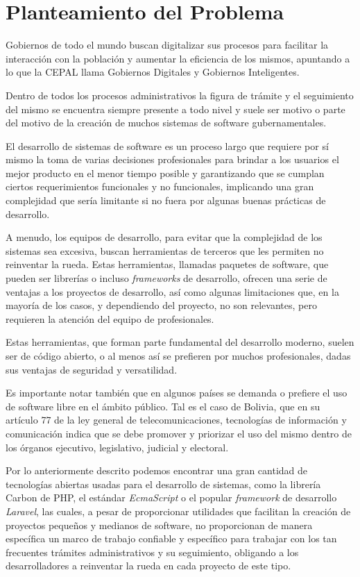 \section{Planteamiento del Problema} \label{problem_statement}

Gobiernos de todo el mundo buscan digitalizar sus
procesos para facilitar la interacción con la población y aumentar la eficiencia
de los mismos, apuntando a lo que la CEPAL llama Gobiernos Digitales y Gobiernos
Inteligentes.

Dentro de todos los procesos administrativos la figura de trámite y el
seguimiento del mismo se encuentra siempre presente a todo nivel y suele ser
motivo o parte del motivo de la creación de muchos sistemas de software
gubernamentales.

El desarrollo de sistemas de software es un proceso largo que requiere por sí
mismo la toma de varias decisiones profesionales para brindar a los usuarios el
mejor producto en el menor tiempo posible y garantizando que se cumplan ciertos
requerimientos funcionales y no funcionales, implicando una gran complejidad que
sería limitante si no fuera por algunas buenas prácticas de desarrollo.

A menudo, los equipos de desarrollo, para evitar que la complejidad de los
sistemas sea excesiva, buscan herramientas de terceros que les permiten no
reinventar la rueda. Estas herramientas, llamadas paquetes de software, que
pueden ser librerías o incluso \textit{frameworks} de desarrollo, ofrecen una serie de
ventajas a los proyectos de desarrollo, así como algunas limitaciones que, en la
mayoría de los casos, y dependiendo del proyecto, no son relevantes, pero
requieren la atención del equipo de profesionales.

Estas herramientas, que forman parte fundamental del desarrollo moderno, suelen
ser de código abierto, o al menos así se prefieren por muchos profesionales,
dadas sus ventajas de seguridad y versatilidad.

Es importante notar también que en algunos países se demanda o prefiere el uso
de software libre en el ámbito público. Tal es el caso de Bolivia, que en su
artículo 77 de la ley general de telecomunicaciones, tecnologías de información
y comunicación indica que se debe promover y priorizar el uso del mismo dentro
de los órganos ejecutivo, legislativo, judicial y electoral.

Por lo anteriormente descrito podemos encontrar una gran cantidad de tecnologías
abiertas usadas para el desarrollo de sistemas, como la librería Carbon de PHP,
el estándar \textit{EcmaScript} o el popular \textit{framework} de desarrollo \textit{Laravel}, las cuales,
a pesar de proporcionar utilidades que facilitan la creación de proyectos
pequeños y medianos de software, no proporcionan de manera específica un marco
de trabajo confiable y específico para trabajar con los tan frecuentes trámites
administrativos y su seguimiento, obligando a los desarrolladores a reinventar
la rueda en cada proyecto de este tipo.

